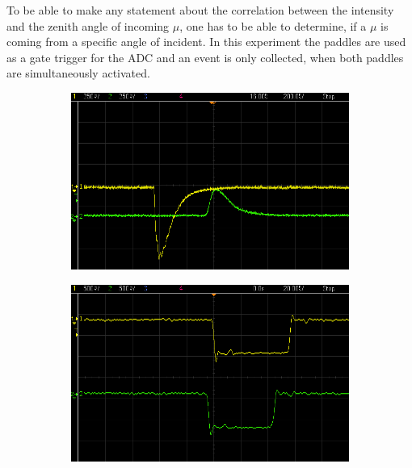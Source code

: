 	To be able to make any statement about the correlation between the intensity and the zenith angle of incoming $\mu$, one has to be able to determine, if a $\mu$ is coming from a specific angle of incident.
	In this experiment the paddles are used as a gate trigger for the ADC and an event is only collected, when both paddles are simultaneously activated.
	
	\begin{figure}[ht]
		\centering
		\begin{subfigure}{0.32\textwidth}
			\includegraphics[width=\textwidth]{img/Winkel/scope_7.png}
			\subcaption{}		
		\end{subfigure}
		\begin{subfigure}{0.32\textwidth}
			\includegraphics[width=\textwidth]{img/Winkel/scope_1.png}
			\subcaption{}
		\end{subfigure}
		\begin{subfigure}{0.32\textwidth}

\end{subfigure}
\end{figure}
